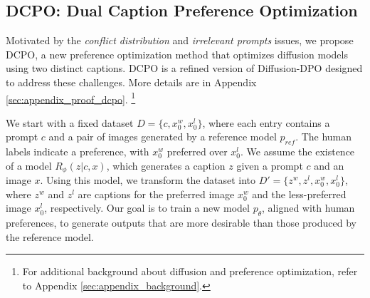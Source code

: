 \subsection{DCPO: Dual Caption Preference Optimization}
\label{sec:dcpo}
Motivated by the \textit{conflict distribution} and \textit{irrelevant prompts} issues, we propose DCPO, a new preference optimization method that optimizes diffusion models using two distinct captions. DCPO is a refined version of Diffusion-DPO designed to address these challenges. More details are in Appendix \ref{sec:appendix_proof_dcpo}. \footnote{For additional background about diffusion and preference optimization, refer to Appendix \ref{sec:appendix_background}.}

We start with a fixed dataset \( D = \{c, x_0^w, x_0^l\} \), where each entry contains a prompt \( c \) and a pair of images generated by a reference model \( p_{ref} \). The human labels indicate a preference, with \( x_0^w \) preferred over \( x_0^l \). We assume the existence of a model \( R_{\phi}(z|c, x) \), which generates a caption \( z \) given a prompt \( c \) and an image \( x \). Using this model, we transform the dataset into \( D' = \{z^w, z^l, x_0^w, x_0^l\} \), where \( z^w \) and \( z^l \) are captions for the preferred image \( x_0^w \) and the less-preferred image \( x_0^l \), respectively. 
Our goal is to train a new model \( p_{\theta} \), aligned with human preferences, to generate outputs that are more desirable than those produced by the reference model.






